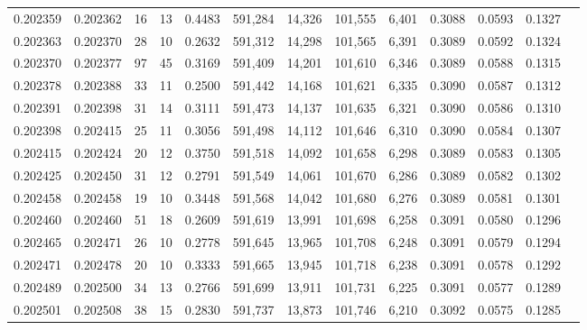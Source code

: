 \begin{tabular}{rrrrrrrrrrrrr}
0.202359 & 0.202362 &    16 &  13 &                                     0.4483 & 591,284 &  14,326 & 101,555 &   6,401 & 0.3088 & 0.0593 & 0.1327 \\
0.202363 & 0.202370 &    28 &  10 &                                     0.2632 & 591,312 &  14,298 & 101,565 &   6,391 & 0.3089 & 0.0592 & 0.1324 \\
0.202370 & 0.202377 &    97 &  45 &                                     0.3169 & 591,409 &  14,201 & 101,610 &   6,346 & 0.3089 & 0.0588 & 0.1315 \\
0.202378 & 0.202388 &    33 &  11 &                                     0.2500 & 591,442 &  14,168 & 101,621 &   6,335 & 0.3090 & 0.0587 & 0.1312 \\
0.202391 & 0.202398 &    31 &  14 &                                     0.3111 & 591,473 &  14,137 & 101,635 &   6,321 & 0.3090 & 0.0586 & 0.1310 \\
0.202398 & 0.202415 &    25 &  11 &                                     0.3056 & 591,498 &  14,112 & 101,646 &   6,310 & 0.3090 & 0.0584 & 0.1307 \\
0.202415 & 0.202424 &    20 &  12 &                                     0.3750 & 591,518 &  14,092 & 101,658 &   6,298 & 0.3089 & 0.0583 & 0.1305 \\
0.202425 & 0.202450 &    31 &  12 &                                     0.2791 & 591,549 &  14,061 & 101,670 &   6,286 & 0.3089 & 0.0582 & 0.1302 \\
0.202458 & 0.202458 &    19 &  10 &                                     0.3448 & 591,568 &  14,042 & 101,680 &   6,276 & 0.3089 & 0.0581 & 0.1301 \\
0.202460 & 0.202460 &    51 &  18 &                                     0.2609 & 591,619 &  13,991 & 101,698 &   6,258 & 0.3091 & 0.0580 & 0.1296 \\
0.202465 & 0.202471 &    26 &  10 &                                     0.2778 & 591,645 &  13,965 & 101,708 &   6,248 & 0.3091 & 0.0579 & 0.1294 \\
0.202471 & 0.202478 &    20 &  10 &                                     0.3333 & 591,665 &  13,945 & 101,718 &   6,238 & 0.3091 & 0.0578 & 0.1292 \\
0.202489 & 0.202500 &    34 &  13 &                                     0.2766 & 591,699 &  13,911 & 101,731 &   6,225 & 0.3091 & 0.0577 & 0.1289 \\
0.202501 & 0.202508 &    38 &  15 &                                     0.2830 & 591,737 &  13,873 & 101,746 &   6,210 & 0.3092 & 0.0575 & 0.1285 \\

\end{tabular}
